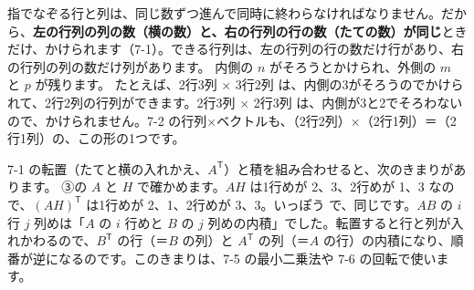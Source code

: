 指でなぞる行と列は、同じ数ずつ進んで同時に終わらなければなりません。だから、\textbf{左の行列の列の数（横の数）と、右の行列の行の数（たての数）が同じ}ときだけ、かけられます（7-1）。できる行列は、左の行列の行の数だけ行があり、右の行列の列の数だけ列があります。
内側の $n$ がそろうとかけられ、外側の $m$ と $p$ が残ります。
たとえば、2行3列 × 3行2列 は、内側の3がそろうのでかけられて、2行2列の行列ができます。2行3列 × 2行3列 は、内側が3と2でそろわないので、かけられません。7-2 の行列×ベクトルも、（2行2列）×（2行1列）＝（2行1列）の、この形の1つです。

\begin{motto}[4]
7-1 の転置（たてと横の入れかえ、$A^{\mathsf T}$）と積を組み合わせると、次のきまりがあります。
③の $A$ と $H$ で確かめます。$AH$ は1行めが 2、3、2行めが 1、3 なので、$(AH)^{\mathsf T}$ は1行めが 2、1、2行めが 3、3。いっぽう
で、同じです。$AB$ の $i$ 行 $j$ 列めは「$A$ の $i$ 行めと $B$ の $j$ 列めの内積」でした。転置すると行と列が入れかわるので、$B^{\mathsf T}$ の行（＝$B$ の列）と $A^{\mathsf T}$ の列（＝$A$ の行）の内積になり、順番が逆になるのです。このきまりは、7-5 の最小二乗法や 7-6 の回転で使います。
\end{motto}

\label{bk:7-3:junban}

